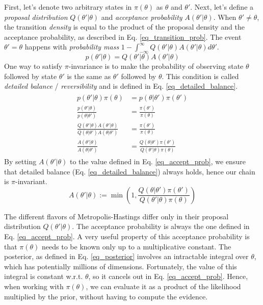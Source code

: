 \documentclass[12pt]{article}
\begin{document}
First, let's denote two arbitrary states in $\pi(\theta)$ as $\theta$ and $\theta'$. Next, let's define a \textit{proposal distribution} $Q(\theta'|\theta)$ and \textit{acceptance probability} $A(\theta'|\theta)$. When $\theta' \ne \theta$, the transition \textit{density} is equal to the product of the proposal density and the acceptance probability, as described in Eq. \ref{eq_transition_prob}. The event $\theta' = \theta$ happens with \textit{probability mass} $1-\int_{-\infty}^{\infty} Q(\theta'|\theta)A(\theta'|\theta) d\theta'$.
\begin{equation}
p(\theta'|\theta) = Q(\theta'|\theta)A(\theta'|\theta)
\label{eq_transition_prob}
\end{equation}
One way to satisfy $\pi$-invariance is to make the probability of observing state $\theta$ followed by state $\theta'$ is the same as $\theta'$ followed by $\theta$. This condition is called \textit{detailed balance} / \textit{reversibility} and is defined in Eq. \ref{eq_detailed_balance}.
\begin{align}
\begin{split}
p(\theta'|\theta)\pi(\theta) &= p(\theta|\theta')\pi(\theta') \\
\frac{p(\theta'|\theta)}{p(\theta|\theta')} &= \frac{\pi(\theta')}{\pi(\theta)} \\
\frac{Q(\theta'|\theta)A(\theta'|\theta)}{Q(\theta|\theta')A(\theta|\theta')} &= \frac{\pi(\theta')}{\pi(\theta)} \\
\frac{A(\theta'|\theta)}{A(\theta|\theta')} &= \frac{Q(\theta|\theta')\pi(\theta')}{Q(\theta'|\theta)\pi(\theta)}
\label{eq_detailed_balance}
\end{split}
\end{align}
By setting $A(\theta'|\theta)$ to the value defined in Eq. \ref{eq_accept_prob}, we ensure that detailed balance (Eq. \ref{eq_detailed_balance}) always holds, hence our chain is $\pi$-invariant. 
\begin{equation}
A(\theta'|\theta) := \min \left(1, \frac{Q(\theta|\theta')\pi(\theta')}{Q(\theta'|\theta)\pi(\theta)} \right)
\label{eq_accept_prob}
\end{equation}

The different flavors of Metropolis-Hastings differ only in their proposal distribution $Q(\theta'|\theta)$. The acceptance probability is always the one defined in Eq. \ref{eq_accept_prob}. A very useful property of this acceptance probability is that $\pi(\theta)$ needs to be known only up to a multiplicative constant. The posterior, as defined in Eq. \ref{eq_posterior} involves an intractable integral over $\theta$, which has potentially millions of dimensions. Fortunately, the value of this integral is constant w.r.t. $\theta$, so it cancels out in Eq. \ref{eq_accept_prob}. Hence, when working with $\pi(\theta)$, we can evaluate it as a product of the likelihood multiplied by the prior, without having to compute the evidence.
\end{document}
